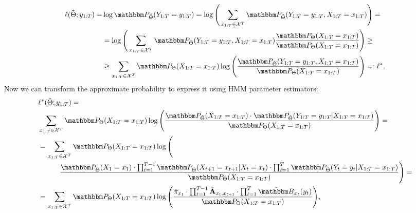 \documentclass[shortabstract]{iithesis}
\begin{document}
\begin{equation*}
    \begin{aligned}
        \ell (\Tilde{\Theta}; y_{1:T}) = &\log \mathbbm P_{\Tilde{\Theta}}(Y_{1:T}=y_{1:T}) = \log \Bigg( \sum_{x_{1:T} \in \mathcal X^T} \mathbbm P_{\Tilde{\Theta}}(Y_{1:T}=y_{1:T}, X_{1:T}=x_{1:T}) \Bigg) = \\
        & = \log \Bigg( \sum_{x_{1:T} \in \mathcal X^T} \mathbbm P_{\Tilde{\Theta}}(Y_{1:T}=y_{1:T}, X_{1:T}=x_{1:T}) \frac{\mathbbm P_{\Theta}(X_{1:T}=x_{1:T})}{\mathbbm P_{\Theta}(X_{1:T}=x_{1:T})} \Bigg) \geq \\
        & \geq \sum_{x_{1:T} \in \mathcal X^T} \mathbbm P_{\Theta}(X_{1:T}=x_{1:T}) \log \Bigg(  \frac{\mathbbm P_{\Tilde{\Theta}}(Y_{1:T}=y_{1:T}, X_{1:T}=x_{1:T})}{\mathbbm P_{\Theta}(X_{1:T}=x_{1:T})} \Bigg) =: \ell^* \text{.}\\
    \end{aligned}
\end{equation*}
\linebreak
Now we can transform the approximate probability to express it using HMM parameter estimators:
\begin{equation*}
    \begin{aligned}
        & \ell^* (\Tilde{\Theta}; y_{1:T}) = \\ & \sum_{x_{1:T} \in \mathcal X^T} \mathbbm P_{\Theta}(X_{1:T}=x_{1:T}) \log \Bigg( \frac{\mathbbm P_{\Tilde{\Theta}}(X_{1:T}=x_{1:T}) \cdot  \mathbbm P_{\Tilde{\Theta}}(Y_{1:T}=y_{1:T} | X_{1:T}=x_{1:T})}{\mathbbm P_{\Theta}(X_{1:T}=x_{1:T})} \Bigg) = \\
        & = \sum_{x_{1:T} \in \mathcal X^T} \mathbbm P_{\Theta}(X_{1:T}=x_{1:T}) \log \Bigg( \\ & \quad \quad \quad \frac{\mathbbm P_{\Tilde{\Theta}}(X_{1}=x_{1}) \cdot \prod_{t=1}^{T-1} \mathbbm P_{\Tilde{\Theta}}(X_{t+1}=x_{t+1}|X_{t}=x_{t})  \cdot \prod_{t=1}^T \mathbbm P_{\Tilde{\Theta}}(Y_{t}=y_{t} | X_{1:T}=x_{1:T})}{\mathbbm P_{\Theta}(X_{1:T}=x_{1:T})} \Bigg) = \\
        & = \sum_{x_{1:T} \in \mathcal X^T} \mathbbm P_{\Theta}(X_{1:T}=x_{1:T}) \log \Bigg( \frac{\Tilde{\pi}_{x_1} \cdot \prod_{t=1}^{T-1} \Tilde{\textbf{A}}_{x_t, x_{t+1}}  \cdot \prod_{t=1}^T \Tilde{\mathbbm B}_{x_t}(y_t)}{\mathbbm P_{\Theta}(X_{1:T}=x_{1:T})} \Bigg) \text{,}
    \end{aligned}
\end{equation*}
\end{document}
